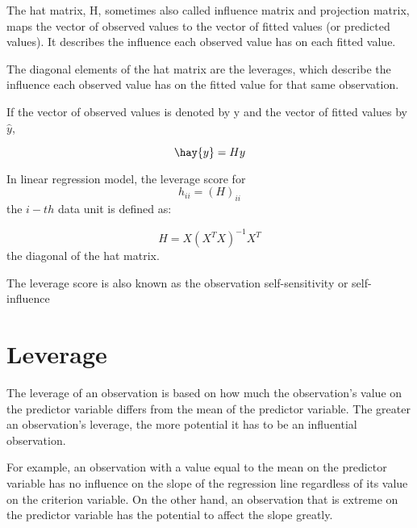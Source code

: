 \documentclass[residuals.tex]{subfiles}
\begin{document}
The hat matrix, H, sometimes also called influence matrix and projection matrix, maps the vector of observed values to the vector of 
fitted values (or predicted values). It describes the influence each observed value has on each fitted value.

The diagonal elements of the hat matrix are the leverages, which describe the influence each observed value has on the fitted value for that same observation.
 
If the vector of observed values is denoted by y and the vector of fitted values by $\hat{y}$,
 
\[ \hay{y} = H y\]



In linear regression model, the leverage score for \[ h_{ii} = (H)_{ii}\] the $i-th$ data unit is defined as:

 
\[ H = X(X^{T} X)^{-1}X^{T} \]
the diagonal of the hat matrix.


The leverage score is also known as the observation self-sensitivity or self-influence

\newpage

\section{Leverage}
The leverage of an observation is based on how much the observation's value on the predictor variable differs from the 
mean of the predictor variable. The greater an observation's leverage, the more potential it has to be an influential observation. 

For example, an observation with a value equal to the mean on the predictor variable has no influence on the slope of the regression line regardless of its value on the criterion variable. On the other hand, an observation that is extreme on the predictor variable has the potential to affect the slope greatly.
\end{document}
